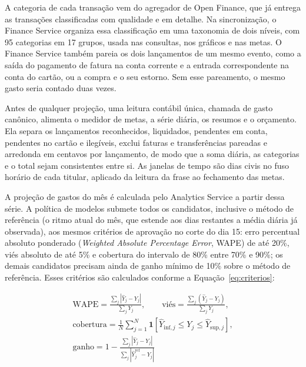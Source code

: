 A categoria de cada transação vem do agregador de Open Finance, que já entrega as transações classificadas com qualidade e em detalhe. Na sincronização, o Finance Service organiza essa classificação em uma taxonomia de dois níveis, com 95 categorias em 17 grupos, usada nas consultas, nos gráficos e nas metas. O Finance Service também pareia os dois lançamentos de um mesmo evento, como a saída do pagamento de fatura na conta corrente e a entrada correspondente na conta do cartão, ou a compra e o seu estorno. Sem esse pareamento, o mesmo gasto seria contado duas vezes.

Antes de qualquer projeção, uma leitura contábil única, chamada de gasto canônico, alimenta o medidor de metas, a série diária, os resumos e o orçamento. Ela separa os lançamentos reconhecidos, liquidados, pendentes em conta, pendentes no cartão e ilegíveis, exclui faturas e transferências pareadas e arredonda em centavos por lançamento, de modo que a soma diária, as categorias e o total sejam consistentes entre si. As janelas de tempo são dias civis no fuso horário de cada titular, aplicado da leitura da frase ao fechamento das metas.

A projeção de gastos do mês é calculada pelo Analytics Service a partir dessa série. A política de modelos submete todos os candidatos, inclusive o método de referência (o ritmo atual do mês, que estende aos dias restantes a média diária já observada), aos mesmos critérios de aprovação no corte do dia 15: erro percentual absoluto ponderado (\textit{Weighted Absolute Percentage Error}, WAPE) de até 20\%, viés absoluto de até 5\% e cobertura do intervalo de 80\% entre 70\% e 90\%; os demais candidatos precisam ainda de ganho mínimo de 10\% sobre o método de referência. Esses critérios são calculados conforme a Equação~\ref{eq:criterios}:

\begin{equation}
\begin{gathered}
\mathrm{WAPE} = \frac{\sum_{j} \left| \hat{Y}_j - Y_j \right|}{\sum_{j} Y_j},
\qquad
\text{viés} = \frac{\sum_{j} \left( \hat{Y}_j - Y_j \right)}{\sum_{j} Y_j},
\\
\text{cobertura} = \frac{1}{N} \sum_{j=1}^{N} \mathbf{1}\left[ \hat{Y}_{\mathrm{inf},j} \le Y_j \le \hat{Y}_{\mathrm{sup},j} \right],
\\
\text{ganho} = 1 - \frac{\sum_{j} \left| \hat{Y}_j - Y_j \right|}{\sum_{j} \left| \hat{Y}^{\mathrm{ref}}_j - Y_j \right|}
\end{gathered}
\label{eq:criterios}
\end{equation}

